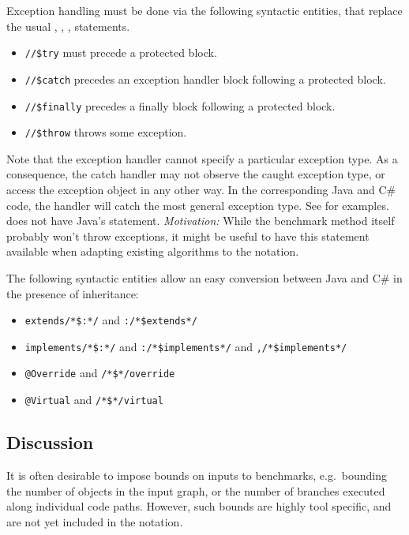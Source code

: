 Exception handling must be done via the following syntactic entities,
that replace the usual , , ,  statements.
\begin{itemize}
\item {\tt //\$try} must precede a protected block.
\item {\tt //\$catch} precedes an exception handler block following a protected block.
\item {\tt //\$finally} precedes a finally block following a protected block.
\item {\tt //\$throw} throws some exception.
\end{itemize}
Note that the exception handler cannot specify a particular exception type.
As a consequence, the catch handler may not observe the caught exception type,
or access the exception object in any other way.
In the corresponding Java and C\# code, the handler will catch the most general exception type.
See  for examples.
 does not have Java's  statement. 
{\it Motivation:} While the benchmark method itself probably won't throw exceptions,
it might be useful to have this statement available when adapting existing algorithms 
to the  notation.

The following syntactic entities allow an easy conversion between Java and C\#
in the presence of inheritance:
\begin{itemize}
\item {\tt extends/*\$:*/} and {\tt :/*\$extends*/}
\item {\tt implements/*\$:*/} and {\tt :/*\$implements*/} and {\tt ,/*\$implements*/}
\item {\tt @Override} and {\tt /*\$*/override}
\item {\tt @Virtual} and {\tt /*\$*/virtual}
\end{itemize}

\subsection{Discussion}

It is often desirable to impose bounds on inputs to benchmarks,
e.g.\ bounding the number of objects in the input graph, or the number of branches executed along individual code paths.
However, such bounds are highly tool specific, and are not yet included in the  notation.
